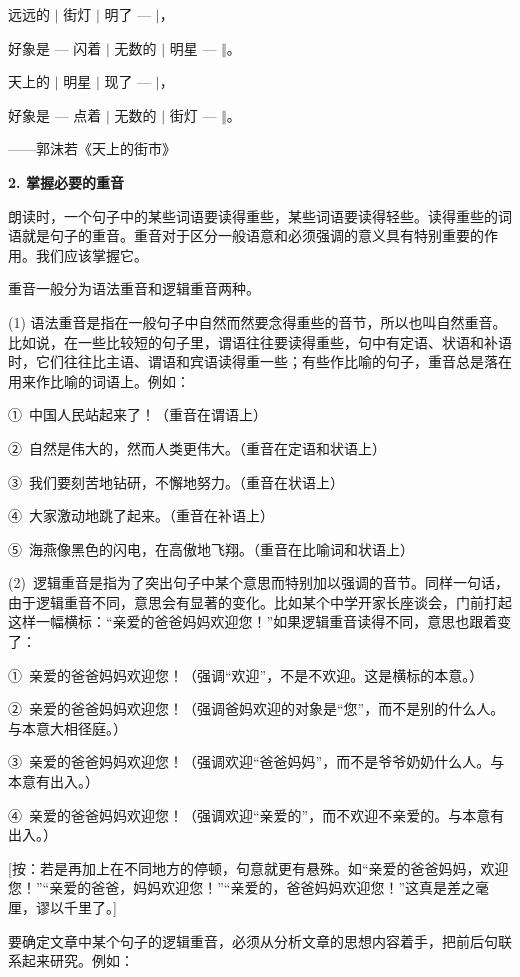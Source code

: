 远远的 $\vert$ 街灯 $\vert$ 明了 --- $\vert$，

好象是 --- 闪着 $\vert$ 无数的 $\vert$ 明星 --- $\Vert$。

天上的 $\vert$ 明星 $\vert$ 现了 --- $\vert$，

好象是 --- 点着 $\vert$ 无数的 $\vert$ 街灯 --- $\Vert$。
\begin{flushright}
——郭沫若《天上的街市》
\end{flushright}

\textbf{2. 掌握必要的重音}

朗读时，一个句子中的某些词语要读得重些，某些词语要读得轻些。读得重些的词语就是句子的重音。重音对于区分一般语意和必须强调的意义具有特别重要的作用。我们应该掌握它。

重音一般分为语法重音和逻辑重音两种。

(1) 语法重音是指在一般句子中自然而然要念得重些的音节，所以也叫自然重音。比如说，在一些比较短的句子里，谓语往往要读得重些，句中有定语、状语和补语时，它们往往比主语、谓语和宾语读得重一些；有些作比喻的句子，重音总是落在用来作比喻的词语上。例如：

①\ 中国人民站起来了！（重音在谓语上）

②\ 自然是伟大的，然而人类更伟大。（重音在定语和状语上）

③\ 我们要刻苦地钻研，不懈地努力。（重音在状语上）

④\ 大家激动地跳了起来。（重音在补语上）

⑤\ 海燕像黑色的闪电，在高傲地飞翔。（重音在比喻词和状语上）

(2)\ 逻辑重音是指为了突出句子中某个意思而特别加以强调的音节。同样一句话，由于逻辑重音不同，意思会有显著的变化。比如某个中学开家长座谈会，门前打起这样一幅横标：“亲爱的爸爸妈妈欢迎您！”如果逻辑重音读得不同，意思也跟着变了：

①\ 亲爱的爸爸妈妈欢迎您！（强调“欢迎”，不是不欢迎。这是横标的本意。）

②\ 亲爱的爸爸妈妈欢迎您！（强调爸妈欢迎的对象是“您”，而不是别的什么人。与本意大相径庭。）

③\ 亲爱的爸爸妈妈欢迎您！（强调欢迎“爸爸妈妈”，而不是爷爷奶奶什么人。与本意有出入。）

④\ 亲爱的爸爸妈妈欢迎您！（强调欢迎“亲爱的”，而不欢迎不亲爱的。与本意有出入。）

[按：若是再加上在不同地方的停顿，句意就更有悬殊。如“亲爱的爸爸妈妈，欢迎您！”“亲爱的爸爸，妈妈欢迎您！”“亲爱的，爸爸妈妈欢迎您！”这真是差之毫厘，谬以千里了。]

要确定文章中某个句子的逻辑重音，必须从分析文章的思想内容着手，把前后句联系起来研究。例如：

